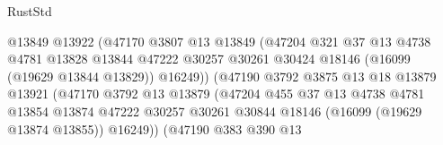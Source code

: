 \begin{lexlean}{RustStd}
\begin{coremodule}
                                        @13849
                                        @13922
                                        (@47170
                                          @3807
                                          @13
                                          @13849
                                          (@47204
                                            @321
                                            @37
                                            @13
                                            @4738
                                            @4781
                                            @13828
                                            @13844
                                            @47222
                                            @30257
                                            @30261
                                            @30424
                                            @18146
                                            (@16099 (@19629 @13844 @13829))
                                            @16249))
                                        (@47190
                                          @3792
                                          @3875
                                          @13
                                          @18
                                          @13879
                                          @13921
                                          (@47170
                                            @3792
                                            @13
                                            @13879
                                            (@47204
                                              @455
                                              @37
                                              @13
                                              @4738
                                              @4781
                                              @13854
                                              @13874
                                              @47222
                                              @30257
                                              @30261
                                              @30844
                                              @18146
                                              (@16099 (@19629 @13874 @13855))
                                              @16249))
                                          (@47190
                                            @383
                                            @390
                                            @13

\end{coremodule}
\end{lexlean}
